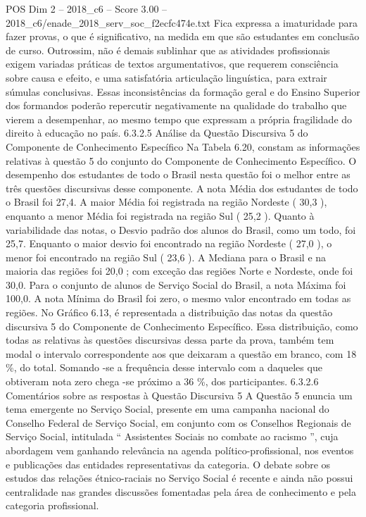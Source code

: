 \begin{textsample}{POS Dim 2 – 2018\_c6 – Score 3.00 – 2018\_c6/enade\_2018\_serv\_soc\_f2ecfc474e.txt}
Fica expressa a imaturidade para fazer provas, o que é significativo, na medida em que são estudantes em conclusão de curso.
Outrossim, não é demais sublinhar que as atividades profissionais exigem variadas práticas de textos argumentativos, que requerem consciência sobre causa e efeito, e uma satisfatória articulação linguística, para extrair súmulas conclusivas.
Essas inconsistências da formação geral e do Ensino Superior dos formandos poderão repercutir negativamente na qualidade do trabalho que vierem a desempenhar, ao mesmo tempo que expressam a própria fragilidade do direito à educação no país. 6.3.2.5 Análise da Questão Discursiva 5 do Componente de Conhecimento Específico Na Tabela 6.20, constam as informações relativas à questão 5 do conjunto do Componente de Conhecimento Específico.
O desempenho dos estudantes de todo o Brasil nesta questão foi o melhor entre as três questões discursivas desse componente.
A nota Média dos estudantes de todo o Brasil foi 27,4.
A maior Média foi registrada na região Nordeste ( 30,3 ), enquanto a menor Média foi registrada na região Sul ( 25,2 ).
Quanto à variabilidade das notas, o Desvio padrão dos alunos do Brasil, como um todo, foi 25,7.
Enquanto o maior desvio foi encontrado na região Nordeste ( 27,0 ), o menor foi encontrado na região Sul ( 23,6 ).
A Mediana para o Brasil e na maioria das regiões foi 20,0 ; com exceção das regiões Norte e Nordeste, onde foi 30,0.
Para o conjunto de alunos de Serviço Social do Brasil, a nota Máxima foi 100,0.
A nota Mínima do Brasil foi zero, o mesmo valor encontrado em todas as regiões.
No Gráfico 6.13, é representada a distribuição das notas da questão discursiva 5 do Componente de Conhecimento Específico.
Essa distribuição, como todas as relativas às questões discursivas dessa parte da prova, também tem modal o intervalo correspondente aos que deixaram a questão em branco, com 18 \%, do total.
Somando -se a frequência desse intervalo com a daqueles que obtiveram nota zero chega -se próximo a 36 \%, dos participantes. 6.3.2.6 Comentários sobre as respostas à Questão Discursiva 5 A Questão 5 enuncia um tema emergente no Serviço Social, presente em uma campanha nacional do Conselho Federal de Serviço Social, em conjunto com os Conselhos Regionais de Serviço Social, intitulada “ Assistentes Sociais no combate ao racismo ”, cuja abordagem vem ganhando relevância na agenda político-profissional, nos eventos e publicações das entidades representativas da categoria.
O debate sobre os estudos das relações étnico-raciais no Serviço Social é recente e ainda não possui centralidade nas grandes discussões fomentadas pela área de conhecimento e pela categoria profissional.

\end{textsample}
